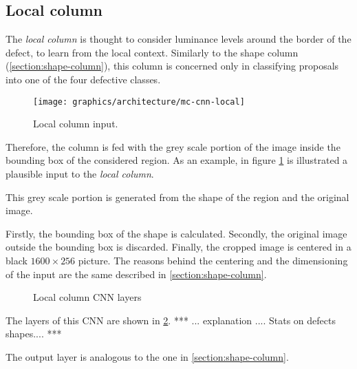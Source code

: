     \subsection{Local column}\label{section:local-column}
        \par{
            The \emph{local column} is thought to consider luminance levels around the border of the defect, to learn from the local context. Similarly to the shape column (\ref{section:shape-column}), this column is concerned only in classifying proposals into one of the four defective classes.
        }
        \begin{figure}
            \centering
            \texttt{[image: graphics/architecture/mc-cnn-local]}
            \caption{Local column input.}\label{fig:mc-cnn:local-input}
        \end{figure}
        \par{
            Therefore, the column is fed with the grey scale portion of the image inside the bounding box of the considered region. As an example, in figure \ref{fig:mc-cnn:local-input} is illustrated a plausible input to the \emph{local column}.
        }
        \par{
            This grey scale portion is generated from the shape of the region and the original image.
        }
        \par{
            Firstly, the bounding box of the shape is calculated. Secondly, the original image outside the bounding box is discarded. Finally, the cropped image is centered in a black $1600\times 256$ picture. The reasons behind the centering and the dimensioning of the input are the same described in \ref{section:shape-column}.
        }
        \begin{figure}
            \centering
            \caption{Local column CNN layers}\label{fig:mc-cnn:local-structure}
        \end{figure}
        \par{
            The layers of this CNN are shown in \ref{fig:mc-cnn:local-structure}. *** ... explanation .... Stats on defects shapes.... ***
        }
        \par{
            The output layer is analogous to the one in \ref{section:shape-column}.
        }
